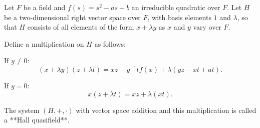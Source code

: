 Let $F$ be a field and $f(s) = s^2 - as - b$ an irreducible quadratic over $F$. Let $H$ be a two-dimensional right vector space over $F$, with basis elements $1$ and $\lambda$, so that $H$ consists of all elements of the form $x + \lambda y$ as $x$ and $y$ vary over $F$.

Define a multiplication on $H$ as follows:

If $y \neq 0$:
$$(x + \lambda y)(z + \lambda t) = xz - y^{-1}tf(x) + \lambda(yz - xt + at).$$

If $y = 0$:
$$x(z + \lambda t) = xz + \lambda(xt).$$

The system $(H, +, \cdot)$ with vector space addition and this multiplication is called a **Hall quasifield**.

